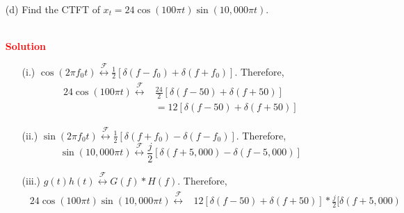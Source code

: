 \documentclass[a4paper, 12pt]{article}
\begin{document}
\begin{itemize}
\begin{itemize}
\pagebreak
\item[(d)]{Find the CTFT of $x_{t} = 24\cos\left(100\pi t \right) \sin \left(10,000 \pi t \right)$.}
\begin{figure}[h!]
\end{figure} \\
\textcolor{red}{\textbf{Solution}}
\begin{itemize}
\item[(i.)]{$\cos \left(2 \pi f_{0} t\right) \overset{\mathcal{F}}{\leftrightarrow} \frac{1}{2} \left[\delta \left(f - f_{0}\right) + \delta(f + f_{0}) \right]$. Therefore,}
\begin{equation}
\begin{gathered}
\begin{alignedat}{1}
24 \cos \left(100 \pi t \right) \overset{\mathcal{F}}{\leftrightarrow} &\frac{24}{2} \left[ \delta \left(f - 50 \right) + \delta \left(f + 50 \right) \right] \\
& = 12 \left[ \delta \left(f - 50\right) + \delta \left(f + 50 \right) \right]
\end{alignedat}
\end{gathered}
\end{equation}
\item[(ii.)]{$\sin \left(2 \pi f_{0} t\right) \overset{\mathcal{F}}{\leftrightarrow} \frac{1}{2} \left[\delta \left(f + f_{0}\right) - \delta(f - f_{0}) \right]$. Therefore,}
\begin{equation}
\sin \left(10,000 \pi t \right) \overset{\mathcal{F}}{\leftrightarrow}  \frac{j}{2}\left[ \delta \left(f + 5,000 \right) - \delta \left(f - 5,000 \right) \right]
\end{equation}
\item[(iii.)]{$g(t)h(t) \overset{\mathcal{F}}{\leftrightarrow} G(f)*H(f)$. Therefore,}
\begin{equation}
\begin{gathered}
\begin{alignedat}{1}
24 \cos \left(100 \pi t \right) \sin \left(10,000 \pi t \right) \overset{\mathcal{F}}{\leftrightarrow} & 12 \left[ \delta \left(f - 50\right) + \delta \left(f + 50 \right) \right] * \frac{j}{2}[ \delta \left(f + 5,000 \right) \\

\end{alignedat}
\end{gathered}
\end{equation}
\end{itemize}
\end{itemize}
\end{itemize}
\end{document}
